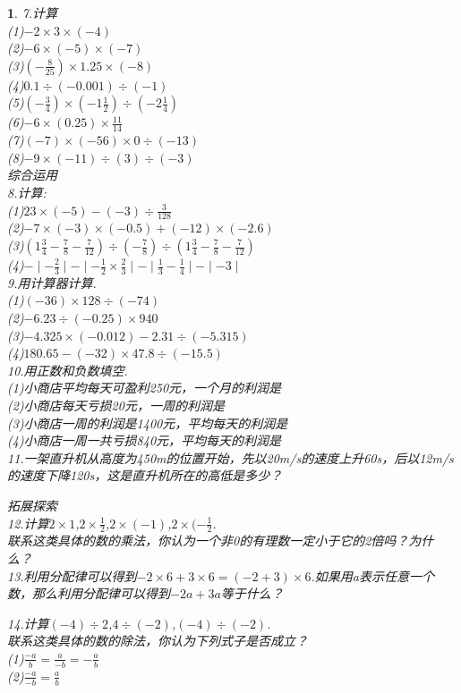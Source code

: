 \documentclass[11pt]{article}
\newtheorem{exercise}{ }
\begin{document}
\begin{exercise}
7.计算\\
(1)$-2\times3\times(-4)$\\
(2)$-6\times(-5)\times(-7)$\\
(3)$(-\frac{8}{25})\times1.25\times(-8)$\\
(4)$0.1\div(-0.001)\div(-1)$\\
(5)$(-\frac{3}{4})\times(-1\frac{1}{2})\div(-2\frac{1}{4})$\\
(6)$-6\times(0.25)\times\frac{11}{14}$\\
(7)$(-7)\times(-56)\times0\div(-13)$\\
(8)$-9\times(-11)\div(3)\div(-3)$\\

综合运用\\
8.计算:\\
(1)$23\times(-5)-(-3)\div\frac{3}{128}$\\
(2)$-7\times(-3)\times(-0.5)+(-12)\times(-2.6)$\\
(3)$(1\frac{3}{4}-\frac{7}{8}-\frac{7}{12})\div(-\frac{7}{8})\div(1\frac{3}{4}-\frac{7}{8}-\frac{7}{12})$\\
(4)$-\mid-\frac{2}{3}\mid-\mid-\frac{1}{2}\times\frac{2}{3}\mid-\mid\frac{1}{3}-\frac{1}{4}\mid-\mid-3\mid$\\

9.用计算器计算.\\
(1)$(-36)\times128\div(-74)$\\
(2)$-6.23\div(-0.25)\times940$\\
(3)$-4.325\times(-0.012)-2.31\div(-5.315)$\\
(4)$180.65-(-32)\times47.8\div(-15.5)$\\

10.用正数和负数填空.\\
(1)小商店平均每天可盈利250元，一个月的利润是\\
(2)小商店每天亏损20元，一周的利润是\\
(3)小商店一周的利润是1400元，平均每天的利润是\\
(4)小商店一周一共亏损840元，平均每天的利润是\\

11.一架直升机从高度为450m的位置开始，先以20m/s的速度上升60s，后以12m/s的速度下降120s，这是直升机所在的高低是多少？

拓展探索\\
12.计算$2\times1$,$2\times\frac{1}{2}$,$2\times(-1)$,$2\times(-\frac{1}{2}$.\\
联系这类具体的数的乘法，你认为一个非0的有理数一定小于它的2倍吗？为什么？\\

13.利用分配律可以得到$-2\times6+3\times6=(-2+3)\times6$.如果用a表示任意一个数，那么利用分配律可以得到$-2a+3a$等于什么？

14.计算$(-4)\div2$,$4\div(-2)$,$(-4)\div(-2)$.\\
联系这类具体的数的除法，你认为下列式子是否成立？\\
(1)$\frac{-a}{b}=\frac{a}{-b}=-\frac{a}{b}$\\
(2)$\frac{-a}{-b}=\frac{a}{b}$\\
\end{exercise}
\end{document}
